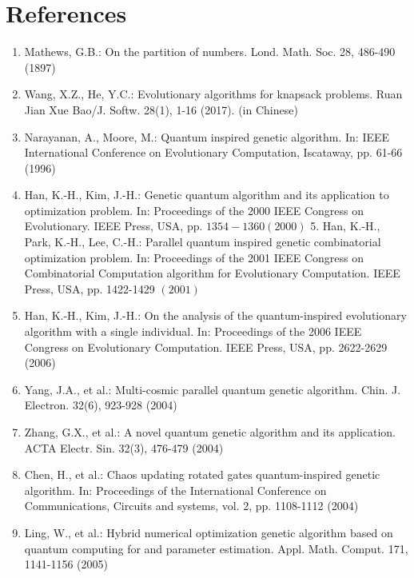 \documentclass[10pt]{article}
\begin{document}
\section{References}
\begin{enumerate}
  \item Mathews, G.B.: On the partition of numbers. Lond. Math. Soc. 28, 486-490 (1897)

  \item Wang, X.Z., He, Y.C.: Evolutionary algorithms for knapsack problems. Ruan Jian Xue Bao/J. Softw. 28(1), 1-16 (2017). (in Chinese)

  \item Narayanan, A., Moore, M.: Quantum inspired genetic algorithm. In: IEEE International Conference on Evolutionary Computation, Iscataway, pp. 61-66 (1996)

  \item Han, K.-H., Kim, J.-H.: Genetic quantum algorithm and its application to optimization problem. In: Proceedings of the 2000 IEEE Congress on Evolutionary. IEEE Press, USA, pp. $1354-1360(2000)$ 5. Han, K.-H., Park, K.-H., Lee, C.-H.: Parallel quantum inspired genetic combinatorial optimization problem. In: Proceedings of the 2001 IEEE Congress on Combinatorial Computation algorithm for Evolutionary Computation. IEEE Press, USA, pp. 1422-1429 $(2001)$

  \item Han, K.-H., Kim, J.-H.: On the analysis of the quantum-inspired evolutionary algorithm with a single individual. In: Proceedings of the 2006 IEEE Congress on Evolutionary Computation. IEEE Press, USA, pp. 2622-2629 (2006)

  \item Yang, J.A., et al.: Multi-cosmic parallel quantum genetic algorithm. Chin. J. Electron. 32(6), 923-928 (2004)

  \item Zhang, G.X., et al.: A novel quantum genetic algorithm and its application. ACTA Electr. Sin. 32(3), 476-479 (2004)

  \item Chen, H., et al.: Chaos updating rotated gates quantum-inspired genetic algorithm. In: Proceedings of the International Conference on Communications, Circuits and systems, vol. 2, pp. 1108-1112 (2004)

  \item Ling, W., et al.: Hybrid numerical optimization genetic algorithm based on quantum computing for and parameter estimation. Appl. Math. Comput. 171, 1141-1156 (2005)


\end{enumerate}
\end{document}
